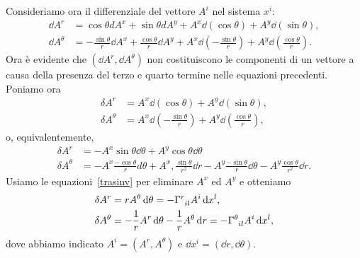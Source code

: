 Consideriamo ora il differenziale del vettore $A^i$ nel sistema $x^i$:
\begin{subequations}
  \begin{align}
    \dd A^r &= \cos \theta d A^x + \sin \theta dA^y + A^x \dd(\cos \theta) + A^y
              \dd(\sin \theta), \\
    \dd A^{\theta} &= -\frac{\sin\theta}{r} \dd A^x + \frac{\cos\theta}{r}
                     \dd A^y + A^x \dd\left(-\frac{\sin \theta}{r}\right) + A^y
                     \dd\left(\frac{\cos \theta}{r}\right).
  \end{align}
\end{subequations}
Ora è evidente che $(\dd A^r,\dd A^{\theta})$ non costituiscono le componenti di
un vettore a causa della presenza del terzo e quarto termine nelle equazioni
precedenti.  Poniamo ora
\begin{subequations}
  \begin{align}
    \delta A^r        &= A^x \dd(\cos \theta) + A^y \dd(\sin \theta),  \\
    \delta A^{\theta} &= A^x \dd\left(-\frac{\sin\theta}{r}\right) + A^y
                        \dd\left(\frac{\cos\theta}{r}\right),
  \end{align}
\end{subequations}
o, equivalentemente,
\begin{subequations}
  \begin{align}
    \delta A^r        &= -A^x \sin\theta \dd\theta + A^y \cos\theta \dd\theta \\
    \delta A^{\theta} &= -A^x \frac{-\cos\theta}{r} d\theta + A^x,
                        \frac{\sin\theta}{r^2} \dd r -A^y \frac{-\sin\theta}{r}
                        \dd\theta - A^y \frac{\cos\theta}{r^2} \dd r.
  \end{align}
\end{subequations}
Usiamo le equazioni~\eqref{trasinv} per eliminare $A^x$ ed $A^y$ e otteniamo
\begin{subequations}
  \begin{align}
    \delta A^r        &= r A^{\theta} \dd\theta = -\tensor{\Gamma}{^{r}_{il}}
                        A^i \dd x^l, \\
    \delta A^{\theta} &= -\frac{1}{r} A^r \dd\theta -\frac{1}{r} A^{\theta}
                        \dd r = -\tensor{\Gamma}{^{\theta}_{il}} A^i \dd x^l,
  \end{align}
\end{subequations}
dove abbiamo indicato $A^i=(A^r,A^{\theta})$ e $\dd x^i= (\dd r, \dd\theta)$.

